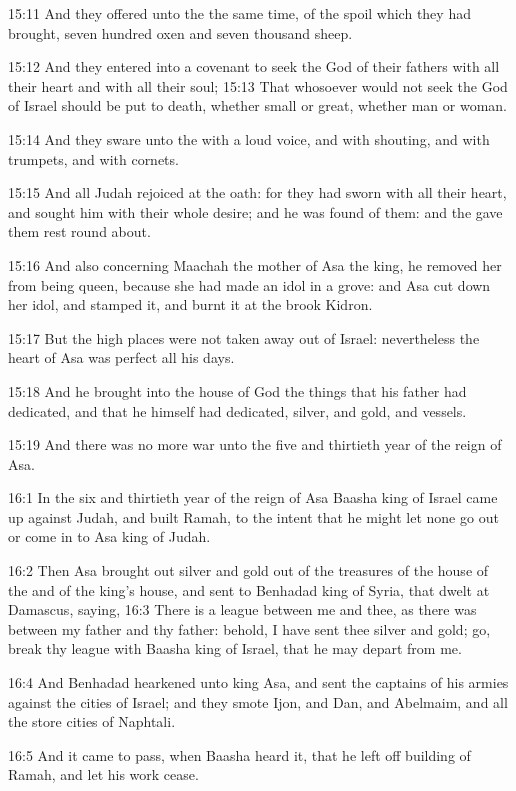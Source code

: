 15:11 And they offered unto the \LORD the same time, of the spoil which they had brought, seven hundred oxen and seven thousand sheep.

15:12 And they entered into a covenant to seek the \LORD God of their fathers with all their heart and with all their soul; 15:13 That whosoever would not seek the \LORD God of Israel should be put to death, whether small or great, whether man or woman.

15:14 And they sware unto the \LORD with a loud voice, and with shouting, and with trumpets, and with cornets.

15:15 And all Judah rejoiced at the oath: for they had sworn with all their heart, and sought him with their whole desire; and he was found of them: and the \LORD gave them rest round about.

15:16 And also concerning Maachah the mother of Asa the king, he removed her from being queen, because she had made an idol in a grove: and Asa cut down her idol, and stamped it, and burnt it at the brook Kidron.

15:17 But the high places were not taken away out of Israel: nevertheless the heart of Asa was perfect all his days.

15:18 And he brought into the house of God the things that his father had dedicated, and that he himself had dedicated, silver, and gold, and vessels.

15:19 And there was no more war unto the five and thirtieth year of the reign of Asa.

16:1 In the six and thirtieth year of the reign of Asa Baasha king of Israel came up against Judah, and built Ramah, to the intent that he might let none go out or come in to Asa king of Judah.

16:2 Then Asa brought out silver and gold out of the treasures of the house of the \LORD and of the king's house, and sent to Benhadad king of Syria, that dwelt at Damascus, saying, 16:3 There is a league between me and thee, as there was between my father and thy father: behold, I have sent thee silver and gold; go, break thy league with Baasha king of Israel, that he may depart from me.

16:4 And Benhadad hearkened unto king Asa, and sent the captains of his armies against the cities of Israel; and they smote Ijon, and Dan, and Abelmaim, and all the store cities of Naphtali.

16:5 And it came to pass, when Baasha heard it, that he left off building of Ramah, and let his work cease.

